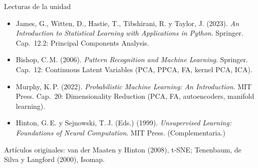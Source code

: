 \documentclass[aspectratio=169,11pt]{beamer}
\begin{document}
\begin{frame}{Lecturas de la unidad}
  \begin{itemize}
    \item James, G., Witten, D., Hastie, T., Tibshirani, R. y Taylor, J. (2023).
          \emph{An Introduction to Statistical Learning with Applications in Python}.
          Springer. \alert{Cap.~12.2: Principal Components Analysis.}
    \item Bishop, C.\,M. (2006). \emph{Pattern Recognition and Machine Learning}.
          Springer. \alert{Cap.~12: Continuous Latent Variables} (PCA, PPCA, FA, kernel PCA, ICA).
    \item Murphy, K.\,P. (2022). \emph{Probabilistic Machine Learning: An Introduction}.
          MIT Press. \alert{Cap.~20: Dimensionality Reduction} (PCA, FA, autoencoders, manifold learning).
    \item Hinton, G.\,E. y Sejnowski, T.\,J. (Eds.) (1999). \emph{Unsupervised Learning:
          Foundations of Neural Computation}. MIT Press. (Complementaria.)
  \end{itemize}
  \vspace{4pt}
  {\small Artículos originales: van der Maaten y Hinton (2008), t-SNE;
  Tenenbaum, de Silva y Langford (2000), Isomap.}
\end{frame}
\end{document}
